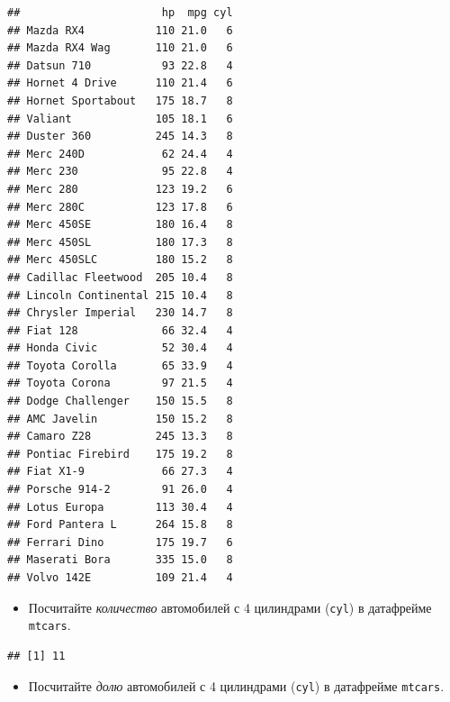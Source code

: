 \documentclass[]{book}
\newenvironment{Shaded}{\begin{snugshade}}{\end{snugshade}}
\newcommand{\KeywordTok}[1]{\textcolor[rgb]{0.13,0.29,0.53}{\textbf{#1}}}
\newcommand{\DecValTok}[1]{\textcolor[rgb]{0.00,0.00,0.81}{#1}}
\newcommand{\StringTok}[1]{\textcolor[rgb]{0.31,0.60,0.02}{#1}}
\newcommand{\OperatorTok}[1]{\textcolor[rgb]{0.81,0.36,0.00}{\textbf{#1}}}
\newcommand{\NormalTok}[1]{#1}
\providecommand{\tightlist}{%
  \setlength{\itemsep}{0pt}\setlength{\parskip}{0pt}}
\begin{document}
\begin{verbatim}
##                      hp  mpg cyl
## Mazda RX4           110 21.0   6
## Mazda RX4 Wag       110 21.0   6
## Datsun 710           93 22.8   4
## Hornet 4 Drive      110 21.4   6
## Hornet Sportabout   175 18.7   8
## Valiant             105 18.1   6
## Duster 360          245 14.3   8
## Merc 240D            62 24.4   4
## Merc 230             95 22.8   4
## Merc 280            123 19.2   6
## Merc 280C           123 17.8   6
## Merc 450SE          180 16.4   8
## Merc 450SL          180 17.3   8
## Merc 450SLC         180 15.2   8
## Cadillac Fleetwood  205 10.4   8
## Lincoln Continental 215 10.4   8
## Chrysler Imperial   230 14.7   8
## Fiat 128             66 32.4   4
## Honda Civic          52 30.4   4
## Toyota Corolla       65 33.9   4
## Toyota Corona        97 21.5   4
## Dodge Challenger    150 15.5   8
## AMC Javelin         150 15.2   8
## Camaro Z28          245 13.3   8
## Pontiac Firebird    175 19.2   8
## Fiat X1-9            66 27.3   4
## Porsche 914-2        91 26.0   4
## Lotus Europa        113 30.4   4
## Ford Pantera L      264 15.8   8
## Ferrari Dino        175 19.7   6
## Maserati Bora       335 15.0   8
## Volvo 142E          109 21.4   4
\end{verbatim}

\begin{itemize}
\tightlist
\item
  Посчитайте \emph{количество} автомобилей с 4 цилиндрами (\texttt{cyl})
  в датафрейме \texttt{mtcars}.
\end{itemize}

\begin{Shaded}
\end{Shaded}

\begin{verbatim}
## [1] 11
\end{verbatim}

\begin{itemize}
\tightlist
\item
  Посчитайте \emph{долю} автомобилей с 4 цилиндрами (\texttt{cyl}) в
  датафрейме \texttt{mtcars}.
\end{itemize}

\begin{Shaded}
\end{Shaded}
\end{document}

